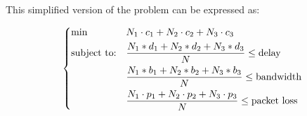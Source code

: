 \documentclass{article}
\begin{document}
\pagebreak

This simplified version of the problem can be expressed as: 

\begin{equation}\label{eq:linear_formulation_final}
	\begin{dcases}
		\begin{aligned}
			& {\text{min}}
			& & N_1 \cdot c_1 + N_2 \cdot c_2 +	N_3 \cdot c_3 \\
			& \text{subject to:}
			& & \frac
			{N_1 * d_1 + N_2 * d_2  + N_3 * d_3 }
			{N}
			\le \text{delay} \\
			& & & \frac
			{N_1 * b_1 + N_2 * b_2  + N_3 * b_3 }
			{N}
			\le \text{bandwidth} \\
			& & & \frac
			{N_1 \cdot p_1 + N_2 \cdot p_2 + N_3 \cdot p_3 }
			{N}
			\le \text{packet loss}
		\end{aligned}
	\end{dcases}
\end{equation}
\end{document}
